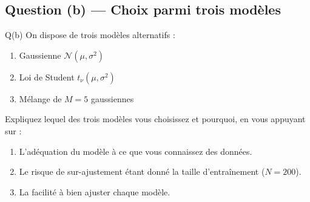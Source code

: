 \documentclass[12pt,a4paper]{article}
\begin{document}
\subsection{Question (b) — Choix parmi trois modèles}

\begin{enonce}{Q(b)}
On dispose de trois modèles alternatifs :
\begin{enumerate}[label=\arabic*.]
  \item Gaussienne $\mathcal{N}(\mu, \sigma^2)$
  \item Loi de Student $t_\nu(\mu, \sigma^2)$
  \item Mélange de $M=5$ gaussiennes
\end{enumerate}
Expliquez lequel des trois modèles vous choisissez et pourquoi, en vous appuyant sur :
\begin{enumerate}[label=(\roman*)]
  \item L'adéquation du modèle à ce que vous connaissez des données.
  \item Le risque de sur-ajustement étant donné la taille d'entraînement ($N=200$).
  \item La facilité à bien ajuster chaque modèle.
\end{enumerate}
\end{enonce}
\end{document}
